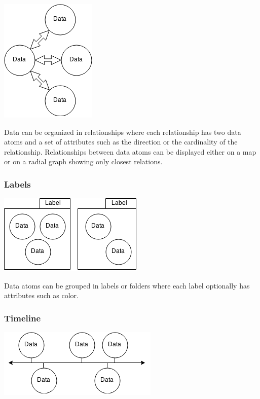 \begin{center}
\includegraphics[width=0.5\linewidth]{00_resources/data_relationships.png}
\end{center}

Data can be organized in relationships where each relationship has two data atoms and a set of attributes such as the direction or the cardinality of the relationship. Relationships between data atoms can be displayed either on a map or on a radial graph showing only closest relations.

\subsubsection{Labels}

\begin{center}
\includegraphics[width=0.5\linewidth]{00_resources/data_labels.png}
\end{center}

Data atoms can be grouped in labels or folders where each label optionally has attributes such as color.

\subsubsection{Timeline}

\begin{center}
\includegraphics[width=0.5\linewidth]{00_resources/data_timeline.png}
\end{center}

